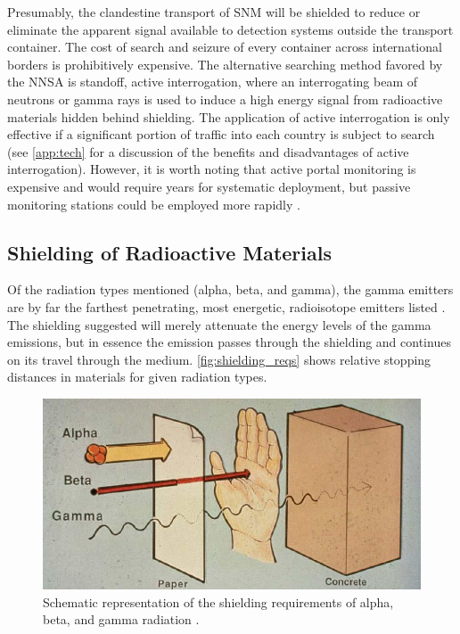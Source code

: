 \documentclass{report}
\begin{document}
Presumably, the clandestine transport of SNM will be shielded to reduce or eliminate the apparent signal available to detection systems outside the transport container. The cost of search and seizure of every container across international borders is prohibitively expensive. The alternative searching method favored by the NNSA is standoff, active interrogation, where an interrogating beam of neutrons or gamma rays is used to induce a high energy signal from radioactive materials hidden behind shielding. The application of active interrogation is only effective if a significant portion of traffic into each country is subject to search (see \autoref{app:tech}  for a discussion of the benefits and disadvantages of active interrogation). However, it is worth noting that active portal monitoring is expensive and would require years for systematic deployment, but passive monitoring stations could be employed more rapidly \cite{Grogan201362}. 

 
\subsection{Shielding of Radioactive Materials}  \label{sec:shielding_mat}


Of the radiation types mentioned (alpha, beta, and gamma), the gamma emitters are by far the farthest penetrating, most energetic, radioisotope emitters listed \cite{krane1987introductory}.  The shielding suggested will merely attenuate the energy levels of the gamma emissions, but in essence the emission passes through the shielding and continues on its travel through the medium. \autoref{fig:shielding_reqs} shows relative stopping distances in materials for given radiation types. 

\begin{figure}[h]
 \centering
 \includegraphics[trim = 0cm 0cm 0cm 0cm, clip,scale=0.5]{./figures/shielding_reqs.jpg}
   \caption{Schematic representation of the shielding requirements of alpha, beta, and gamma radiation \cite{Hallenbeck1994}. }
     \label{fig:shielding_reqs}
\end{figure}
\end{document}
